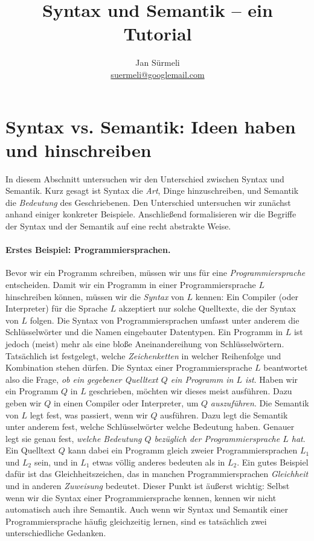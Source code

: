 \documentclass{article}
\title{Syntax und Semantik -- ein Tutorial}
\author{Jan S\"urmeli\\\url{suermeli@googlemail.com}}
\begin{document}
 
 \maketitle
 
 
 \section{Syntax vs. Semantik: Ideen haben und hinschreiben}

 In diesem Abschnitt untersuchen wir den Unterschied zwischen Syntax und 
Semantik. Kurz gesagt ist Syntax die \emph{Art}, Dinge hinzuschreiben, und 
Semantik die \emph{Bedeutung} des Geschriebenen. Den Unterschied untersuchen 
wir zunächst anhand einiger konkreter Beispiele. Anschließend formalisieren wir 
die Begriffe der Syntax und der Semantik auf eine recht abstrakte Weise. 

\paragraph{Erstes Beispiel: Programmiersprachen.} Bevor wir ein Programm 
schreiben, müssen wir uns für eine \emph{Programmiersprache} 
entscheiden. Damit wir ein Programm in einer Programmiersprache $L$ 
hinschreiben können, müssen wir die \emph{Syntax} von $L$ kennen: Ein Compiler 
(oder Interpreter) für die Sprache $L$ akzeptiert nur solche Quelltexte, die 
der Syntax von $L$ folgen. Die Syntax von Programmiersprachen umfasst unter 
anderem die Schlüsselwörter und die Namen eingebauter Datentypen. Ein Programm 
in $L$ ist jedoch (meist) mehr als eine bloße Aneinandereihung von 
Schlüsselwörtern. Tatsächlich ist festgelegt, welche \emph{Zeichenketten} in 
welcher Reihenfolge und Kombination stehen dürfen. Die 
Syntax einer Programmiersprache $L$ beantwortet also die Frage, \emph{ob ein 
gegebener Quelltext $Q$ ein Programm in $L$ ist}. Haben wir ein Programm $Q$ in 
$L$ geschrieben, möchten wir dieses meist ausführen. Dazu geben wir $Q$ in 
einen Compiler oder Interpreter, um $Q$ \emph{auszuführen}. Die Semantik von $L$ 
legt fest, was passiert, wenn wir $Q$ ausführen. Dazu legt die Semantik unter 
anderem fest, welche Schlüsselwörter welche Bedeutung haben. Genauer legt sie 
genau fest, \emph{welche Bedeutung $Q$ bezüglich der Programmiersprache 
$L$ hat}. Ein Quelltext $Q$ kann dabei ein Programm gleich zweier 
Programmiersprachen $L_1$ und $L_2$ sein, und in $L_1$ etwas völlig anderes 
bedeuten als in $L_2$. Ein gutes Beispiel dafür ist das 
Gleichheitszeichen, das in manchen Programmiersprachen \emph{Gleichheit} und in 
anderen \emph{Zuweisung} bedeutet. Dieser Punkt ist äußerst wichtig: Selbst 
wenn wir die Syntax einer Programmiersprache kennen, kennen wir nicht 
automatisch auch ihre Semantik. Auch wenn wir Syntax und Semantik einer 
Programmiersprache häufig gleichzeitig lernen, sind es tatsächlich zwei 
unterschiedliche Gedanken. 
\end{document}
